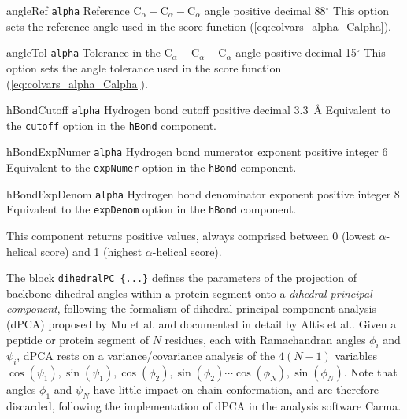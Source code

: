 \begin{cvcoptions}
\item %
  \keydef
    {angleRef}{%
    \texttt{alpha}}{%
    Reference $\mathrm{C}_{\alpha} -
    \mathrm{C}_{\alpha} - \mathrm{C}_{\alpha}$ angle}{%
    positive decimal}{%
    88$^{\circ}$}{%
    This option sets the reference angle used in the score function
    (\ref{eq:colvars_alpha_Calpha}).}

\item %
  \keydef
    {angleTol}{%
    \texttt{alpha}}{%
    Tolerance in the $\mathrm{C}_{\alpha} -
    \mathrm{C}_{\alpha} - \mathrm{C}_{\alpha}$ angle}{%
    positive decimal}{%
    15$^{\circ}$}{%
    This option sets the angle tolerance used in the score function
    (\ref{eq:colvars_alpha_Calpha}).}

\item %
  \keydef
    {hBondCutoff}{%
    \texttt{alpha}}{%
    Hydrogen bond cutoff}{%
    positive decimal}{%
    3.3~\AA{}}{%
    Equivalent to the \texttt{cutoff} option in the \texttt{hBond}
    component.}

\item %
  \keydef
    {hBondExpNumer}{%
    \texttt{alpha}}{%
    Hydrogen bond numerator exponent}{%
    positive integer}{%
    6}{%
    Equivalent to the \texttt{expNumer} option in the \texttt{hBond}
    component.}

\item %
  \keydef
    {hBondExpDenom}{%
    \texttt{alpha}}{%
    Hydrogen bond denominator exponent}{%
    positive integer}{%
    8}{%
    Equivalent to the \texttt{expDenom} option in the \texttt{hBond}
    component.}

\end{cvcoptions}

This component returns positive values, always comprised between 0
(lowest $\alpha$-helical score) and 1 (highest $\alpha$-helical
score).



The block \texttt{dihedralPC~\{...\}} defines the
parameters of the projection of backbone dihedral angles within
a protein segment onto a \emph{dihedral principal component}, following
the formalism of dihedral principal component analysis (dPCA) proposed by
Mu et al.\cite{Mu2005} and documented in detail by Altis et
al.\cite{Altis2007}.
Given a peptide or protein segment of $N$ residues, each with Ramachandran
angles $\phi_i$ and $\psi_i$, dPCA rests on a variance/covariance analysis
of the $4(N-1)$ variables $\cos(\psi_1), \sin(\psi_1), \cos(\phi_2), \sin(\phi_2)
\cdots \cos(\phi_N), \sin(\phi_N)$. Note that angles $\phi_1$ and $\psi_N$
have little impact on chain conformation, and are therefore discarded,
following the implementation of dPCA in the analysis software Carma.\cite{Glykos2006}

